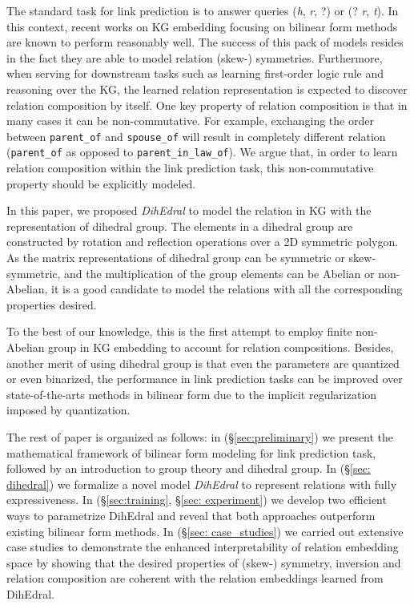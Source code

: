\documentclass[11pt,a4paper]{article}
\begin{document}
The standard task for link prediction is to answer queries (\textit{h}, \textit{r}, ?) or (? \textit{r}, \textit{t}). In this context, recent works on KG embedding focusing on bilinear form methods \cite{complex, hole, analogy, simple} are known to perform reasonably well. The success of this pack of models resides in the fact they are able to model relation (skew-) symmetries. Furthermore, when serving for downstream tasks such as learning first-order logic rule and reasoning over the KG, the learned relation representation is expected to discover relation composition by itself. One key property of relation composition is that in many cases it can be non-commutative. For example, exchanging the order between \verb|parent_of| and \verb|spouse_of| will result in completely different relation (\verb|parent_of| as opposed to \verb|parent_in_law_of|). We argue that, in order to learn relation composition within the link prediction task, this non-commutative property should be explicitly modeled. 

In this paper, we proposed \textit{DihEdral} to model the relation in KG with the representation of dihedral group. The elements in a dihedral group are constructed by rotation and reflection operations over a 2D symmetric polygon.
As the matrix representations of dihedral group can be symmetric or skew-symmetric, and the  multiplication of the group elements can be Abelian or non-Abelian, it is a good candidate to model the relations with all the corresponding properties desired.

To the best of our knowledge, this is the first attempt to employ finite non-Abelian group in KG embedding to account for relation compositions. Besides, another merit of using dihedral group is that even the parameters are quantized or even binarized, the performance in link prediction tasks can be improved over state-of-the-arts methods in bilinear form due to the implicit regularization imposed by quantization.





The rest of paper is organized as follows: in (\S\ref{sec:preliminary}) we present the mathematical framework of bilinear form modeling for link prediction task, followed by an introduction to group theory and dihedral group. In (\S\ref{sec: dihedral}) we formalize a novel model \textit{DihEdral} to represent relations with fully expressiveness. In (\S\ref{sec:training}, \S\ref{sec: experiment}) we develop two efficient ways to parametrize DihEdral and reveal that both approaches outperform existing bilinear form methods.
In (\S\ref{sec: case_studies}) we carried out extensive case studies to demonstrate the enhanced interpretability of relation embedding space by showing that the desired properties of (skew-) symmetry, inversion and relation composition are coherent with the relation embeddings learned from DihEdral.
\end{document}
